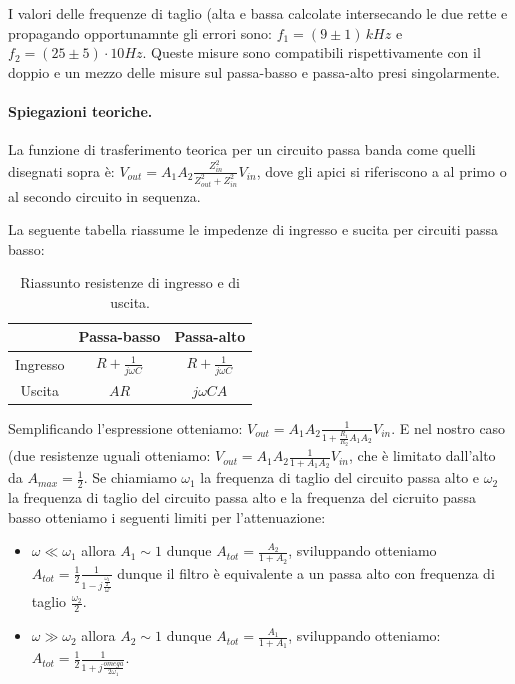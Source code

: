 \documentclass[10pt,a4paper]{article}
\begin{document}
I valori delle frequenze di taglio (alta e bassa calcolate intersecando le due rette e propagando opportunamnte gli errori sono: 
$f_1 = (9\pm1) \, kHz$ e $f_2 = (25 \pm 5) \cdot 10 Hz$. Queste misure sono compatibili rispettivamente con il doppio e un mezzo delle misure sul passa-basso e passa-alto presi singolarmente.


\paragraph{Spiegazioni teoriche.}
La funzione di trasferimento teorica per un circuito passa banda come quelli disegnati sopra è: 
$V_{out} = A_{1} A_{2} \frac{Z_{in}^2}{Z_{out}^2+Z_{in}^2} V_{in}$, dove gli apici si riferiscono a al primo o al secondo circuito in sequenza. 

La seguente tabella riassume le impedenze di ingresso e sucita per circuiti passa basso:

\begin{table}[h]
\centering
\begin{tabular}{|c|c|c|}
\hline 
 & Passa-basso  & Passa-alto \\
\hline 
Ingresso & $R+\frac{1}{j \omega C}$ & $R+\frac{1}{j \omega C}$\\ 
Uscita & $AR$ & $j \omega C A$\\
\hline 
\end{tabular} 
\caption{Riassunto resistenze di ingresso e di uscita.}
\end{table}


Semplificando l'espressione otteniamo: $V_{out} = A_{1} A_{2} \frac{1}{1+\frac{R_1}{R_2} A_1 A_2} V_{in}$.
E nel nostro caso (due resistenze uguali otteniamo:
$V_{out} = A_{1} A_{2} \frac{1}{1+A_1 A_2} V_{in}$, che è limitato dall'alto da $A_{max} = \frac{1}{2}$.
Se chiamiamo $\omega_1$ la frequenza di taglio del circuito passa alto e $\omega_2$ la frequenza di taglio del circuito passa alto e la frequenza del cicruito passa basso otteniamo i seguenti limiti per l'attenuazione:

\begin{itemize}
\item $\omega \ll \omega_1$ allora $A_1 \sim 1$ dunque 
$A_{tot} = \frac{A_2}{1+A_2}$, sviluppando otteniamo 
$A_{tot} = \frac{1}{2} \frac{1}{1-j \frac{\frac{\omega_2}{2}}{\omega}}$ dunque il filtro è equivalente a un passa alto con frequenza di taglio $\frac{\omega_2}{2}$. 
\item $\omega \gg \omega_2$ allora $A_2 \sim 1$ dunque 
$A_{tot} = \frac{A_1}{1+A_1}$, sviluppando otteniamo:
$A_{tot} = \frac{1}{2} \frac{1}{1+j \frac{omega}{2 \omega_1}}$.
\end{itemize}
\end{document}
